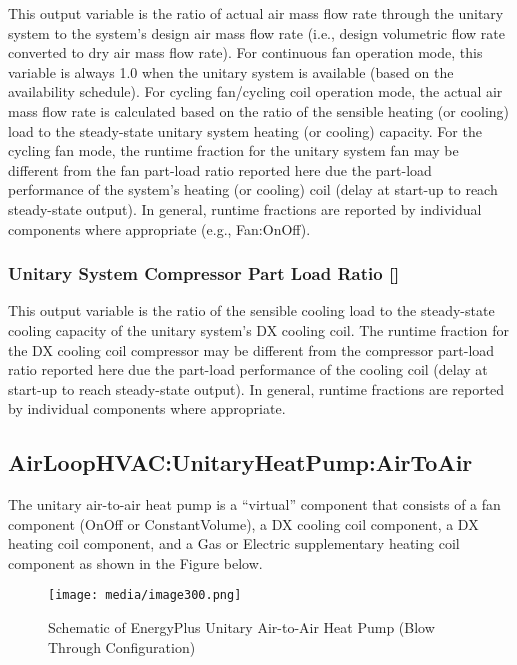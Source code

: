 This output variable is the ratio of actual air mass flow rate through the unitary system to the system's design air mass flow rate (i.e., design volumetric flow rate converted to dry air mass flow rate). For continuous fan operation mode, this variable is always 1.0 when the unitary system is available (based on the availability schedule). For cycling fan/cycling coil operation mode, the actual air mass flow rate is calculated based on the ratio of the sensible heating (or cooling) load to the steady-state unitary system heating (or cooling) capacity. For the cycling fan mode, the runtime fraction for the unitary system fan may be different from the fan part-load ratio reported here due the part-load performance of the system's heating (or cooling) coil (delay at start-up to reach steady-state output). In general, runtime fractions are reported by individual components where appropriate (e.g., Fan:OnOff).

\subsubsection{\texorpdfstring{Unitary System Compressor Part Load Ratio {[]}}{Unitary System Compressor Part Load Ratio }}\label{unitary-system-compressor-part-load-ratio-1}

This output variable is the ratio of the sensible cooling load to the steady-state cooling capacity of the unitary system's DX cooling coil. The runtime fraction for the DX cooling coil compressor may be different from the compressor part-load ratio reported here due the part-load performance of the cooling coil (delay at start-up to reach steady-state output). In general, runtime fractions are reported by individual components where appropriate.

\subsection{AirLoopHVAC:UnitaryHeatPump:AirToAir}\label{airloophvacunitaryheatpumpairtoair}

The unitary air-to-air heat pump is a ``virtual'' component that consists of a fan component (OnOff or ConstantVolume), a DX cooling coil component, a DX heating coil component, and a Gas or Electric supplementary heating coil component as shown in the Figure below.

\begin{figure}[hbtp] %
\centering
\texttt{[image: media/image300.png]}
\caption{Schematic of EnergyPlus Unitary Air-to-Air Heat Pump (Blow Through Configuration) \label{fig:schematic-of-energyplus-unitary-air-to-air-heat-pump-blow-through-configuration}}
\end{figure}


